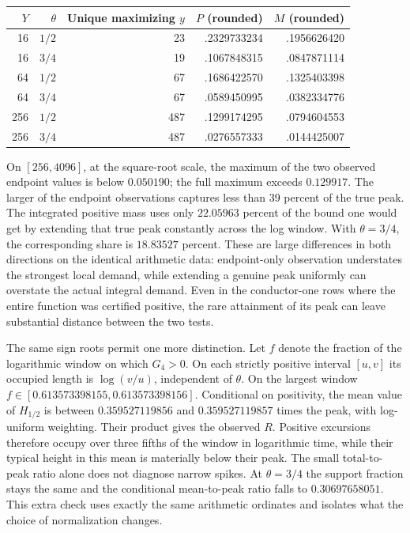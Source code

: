 \documentclass[12pt,letterpaper]{article}
\begin{document}
\begin{center}\small
\begin{tabular}{@{}rrrrr@{}}
\toprule $Y$ & $\theta$ & Unique maximizing $y$ & $P$ (rounded) & $M$ (rounded) \\
\midrule
16 & $1/2$ & 23 & .2329733234 & .1956626420\\
16 & $3/4$ & 19 & .1067848315 & .0847871114\\
64 & $1/2$ & 67 & .1686422570 & .1325403398\\
64 & $3/4$ & 67 & .0589450995 & .0382334776\\
256 & $1/2$ & 487 & .1299174295 & .0794604553\\
256 & $3/4$ & 487 & .0276557333 & .0144425007\\
\bottomrule
\end{tabular}
\end{center}
On \([256,4096]\), at the square-root scale, the maximum of the two observed endpoint values is below \(0.050190\); the full maximum exceeds \(0.129917\). The larger of the endpoint observations captures less than 39 percent of the true peak. The integrated positive mass uses only \(22.05963\) percent of the bound one would get by extending that true peak constantly across the log window. With \(\theta=3/4\), the corresponding share is \(18.83527\) percent. These are large differences in both directions on the identical arithmetic data: endpoint-only observation understates the strongest local demand, while extending a genuine peak uniformly can overstate the actual integral demand. Even in the conductor-one rows where the entire function was certified positive, the rare attainment of its peak can leave substantial distance between the two tests.

The same sign roots permit one more distinction. Let \(f\) denote the fraction of the logarithmic window on which \(G_4>0\). On each strictly positive interval \([u,v]\) its occupied length is \(\log(v/u)\), independent of \(\theta\). On the largest window \(f\in[0.613573398155,0.613573398156]\). Conditional on positivity, the mean value of \(H_{1/2}\) is between \(0.359527119856\) and \(0.359527119857\) times the peak, with log-uniform weighting. Their product gives the observed \(R\). Positive excursions therefore occupy over three fifths of the window in logarithmic time, while their typical height in this mean is materially below their peak. The small total-to-peak ratio alone does not diagnose narrow spikes. At \(\theta=3/4\) the support fraction stays the same and the conditional mean-to-peak ratio falls to \(0.30697658051\). This extra check uses exactly the same arithmetic ordinates and isolates what the choice of normalization changes.
\end{document}
